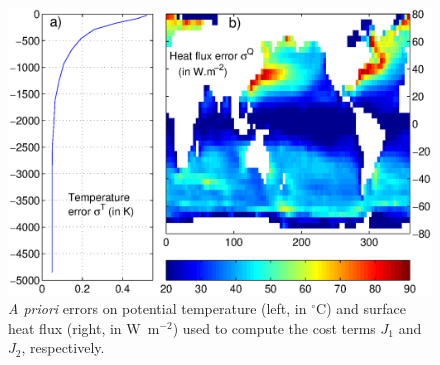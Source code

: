 \begin{figure} [tpb]
\begin{center}
\includegraphics[width=\textwidth,height=.3\textheight]{s_examples/global_oce_optim/Error.eps}
\caption{{\it A priori} errors on potential temperature (left, in $^\circ$C) and
surface heat flux (right, in W~m$^{-2}$) used to compute the cost
terms $J_1$ and $J_2$, respectively.} 
\label{Error}
\end{center}
\end{figure}

